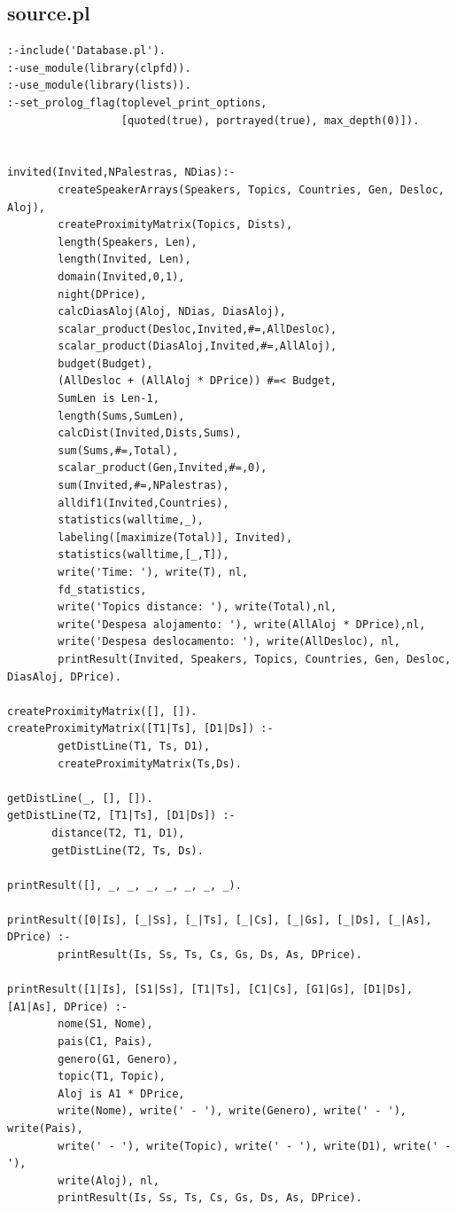 \documentclass[runningheads,a4paper]{llncs}
\begin{document}
\subsection{source.pl}
\begin{verbatim}
:-include('Database.pl').
:-use_module(library(clpfd)).
:-use_module(library(lists)).
:-set_prolog_flag(toplevel_print_options,
                  [quoted(true), portrayed(true), max_depth(0)]).


invited(Invited,NPalestras, NDias):-
        createSpeakerArrays(Speakers, Topics, Countries, Gen, Desloc, Aloj),
        createProximityMatrix(Topics, Dists),
        length(Speakers, Len),
        length(Invited, Len),
        domain(Invited,0,1),
        night(DPrice),
        calcDiasAloj(Aloj, NDias, DiasAloj),
        scalar_product(Desloc,Invited,#=,AllDesloc),
        scalar_product(DiasAloj,Invited,#=,AllAloj),
        budget(Budget),
        (AllDesloc + (AllAloj * DPrice)) #=< Budget,
        SumLen is Len-1,
        length(Sums,SumLen),
        calcDist(Invited,Dists,Sums),
        sum(Sums,#=,Total),
        scalar_product(Gen,Invited,#=,0),
        sum(Invited,#=,NPalestras),
        alldif1(Invited,Countries),
        statistics(walltime,_),
        labeling([maximize(Total)], Invited),
        statistics(walltime,[_,T]),
        write('Time: '), write(T), nl,
        fd_statistics,
        write('Topics distance: '), write(Total),nl,
        write('Despesa alojamento: '), write(AllAloj * DPrice),nl,
        write('Despesa deslocamento: '), write(AllDesloc), nl,
        printResult(Invited, Speakers, Topics, Countries, Gen, Desloc, DiasAloj, DPrice).

createProximityMatrix([], []).
createProximityMatrix([T1|Ts], [D1|Ds]) :-
        getDistLine(T1, Ts, D1),
        createProximityMatrix(Ts,Ds).

getDistLine(_, [], []).
getDistLine(T2, [T1|Ts], [D1|Ds]) :-
       distance(T2, T1, D1),
       getDistLine(T2, Ts, Ds).

printResult([], _, _, _, _, _, _, _).

printResult([0|Is], [_|Ss], [_|Ts], [_|Cs], [_|Gs], [_|Ds], [_|As], DPrice) :-
        printResult(Is, Ss, Ts, Cs, Gs, Ds, As, DPrice).

printResult([1|Is], [S1|Ss], [T1|Ts], [C1|Cs], [G1|Gs], [D1|Ds], [A1|As], DPrice) :-
        nome(S1, Nome),
        pais(C1, Pais),
        genero(G1, Genero),
        topic(T1, Topic),
        Aloj is A1 * DPrice,
        write(Nome), write(' - '), write(Genero), write(' - '), write(Pais),
        write(' - '), write(Topic), write(' - '), write(D1), write(' - '), 
        write(Aloj), nl,
        printResult(Is, Ss, Ts, Cs, Gs, Ds, As, DPrice).
        

\end{verbatim}
\end{document}
